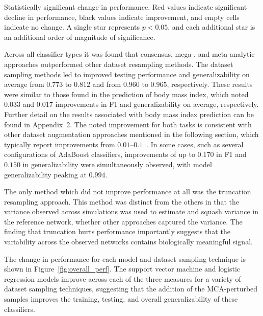 \documentclass[10pt]{SelfArx} %
\newcommand{\new}[1]{\color{blue}#1\color{black}\xspace}
\begin{document}
\begin{table}[b!]
\centering
\caption{Statistically significant change in performance. Red values indicate significant
decline in performance, black values indicate improvement, and empty cells indicate no change. A single star
represents $p < 0.05$, and each additional star is an additional order of magnitude of significance.}
\label{tab1:perf}
\small

\end{table}

Across all classifier types it was found that consensus, mega-, and meta-analytic approaches outperformed other dataset
resampling methods. \new{The dataset sampling methods led to improved testing performance and generalizability
on average from $0.773$ to $0.812$ and from $0.960$ to $0.965$, respectively. These results were similar to those
found in the prediction of body mass index, which noted $0.033$ and $0.017$ improvements in F1 and generalizability on
average, respectively. Further detail on the results associated with body mass index prediction can be found in
Appendix~2. The noted improvement for both tasks is consistent with other dataset augmentation approaches mentioned in
the following section, which typically report improvements from $0.01–0.1$~\cite{shorten2019survey}. In some
cases, such as several configurations of AdaBoost classifiers, improvements of up to $0.170$ in F1 and $0.150$ in
generalizability were simultaneously observed, with model generalizability peaking at $0.994$.}

The only method which did not improve performance at all was the truncation resampling approach. This method was
distinct from the others in that the variance observed across
simulations was used to estimate and squash variance in the reference network, whether other approaches captured the
variance. The finding that truncation hurts performance importantly suggests that the variability across the observed
networks contains biologically meaningful signal.

The change in performance for each model and dataset sampling technique is shown in Figure~\ref{fig:overall_perf}. The
support vector machine and logistic regression models improve across each of the three measures for a variety of
dataset sampling techniques, suggesting that the addition of the MCA-perturbed samples improves the training, testing,
and overall generalizability of these classifiers.
\end{document}
